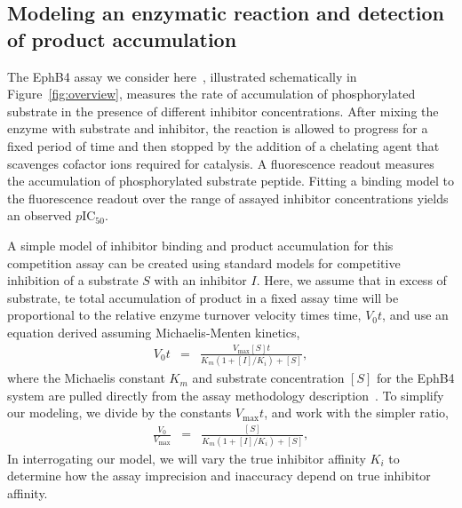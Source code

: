 \documentclass[aps,pre,twocolumn,nofootinbib,superscriptaddress,linenumbers]{revtex4-1}
\begin{document}
\subsection*{Modeling an enzymatic reaction and detection of product accumulation}

The EphB4 assay we consider here~\cite{ekins_dispensing_2013,barlaam_novel_2009,barlaam_pyrimidine_2010}, illustrated schematically in Figure~\ref{fig:overview}, measures the rate of accumulation of phosphorylated substrate in the presence of different inhibitor concentrations.
After mixing the enzyme with substrate and inhibitor, the reaction is allowed to progress for a fixed period of time and then stopped by the addition of a chelating agent that scavenges cofactor ions required for catalysis.
A fluorescence readout measures the accumulation of phosphorylated substrate peptide.
Fitting a binding model to the fluorescence readout over the range of assayed inhibitor concentrations yields an observed $p$IC$_{50}$.

A simple model of inhibitor binding and product accumulation for this competition assay can be created using standard models for competitive inhibition of a substrate $S$ with an inhibitor $I$. 
Here, we assume that in excess of substrate, te total accumulation of product in a fixed assay time will be proportional to the relative enzyme turnover velocity times time, $V_0 t$, and use an equation derived assuming Michaelis-Menten kinetics,
\begin{eqnarray}
V_{0} t &=& \frac{V_\mathrm{max} [S] t}{K_{m}\left(1+[I]/K_{i}\right)+[S]} ,
\end{eqnarray}
where the Michaelis constant $K_{m}$ and substrate concentration $[S]$ for the EphB4 system are pulled directly from the assay methodology description~\cite{barlaam_novel_2009,barlaam_pyrimidine_2010}.
To simplify our modeling, we divide by the constants $V_\mathrm{max} t$, and work with the simpler ratio,
\begin{eqnarray}
\frac{V_{0}}{V_\mathrm{max}} &=& \frac{[S]}{K_{m}\left(1+[I]/K_{i}\right)+[S]} \label{equation:competitive-inhibition} ,
\end{eqnarray}
In interrogating our model, we will vary the true inhibitor affinity $K_{i}$ to determine how the assay imprecision and inaccuracy depend on true inhibitor affinity.
\end{document}
